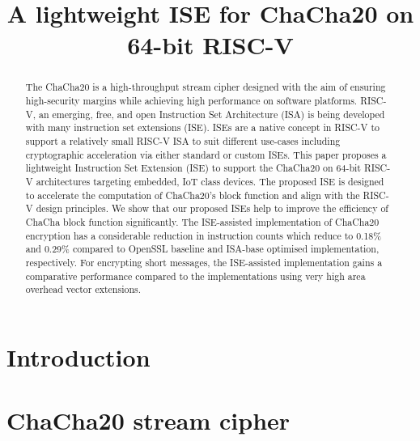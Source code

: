 \documentclass[preprint]{iacrtrans}
\title{A lightweight ISE for ChaCha20 on 64-bit RISC-V}
\author{}
\institute{}
\begin{document}

\maketitle

\begin{abstract}
The ChaCha20 is a high-throughput stream cipher designed with the aim of ensuring high-security margins while achieving high performance on software platforms. RISC-V, an emerging, free, and open Instruction Set Architecture (ISA) is being developed with many instruction set extensions (ISE). ISEs are a native concept in RISC-V to support a relatively small RISC-V ISA to suit different use-cases including cryptographic acceleration via either standard or custom ISEs. This paper proposes a lightweight Instruction Set Extension (ISE) to support the ChaCha20 on 64-bit RISC-V architectures targeting embedded, IoT class devices. The proposed ISE is designed to accelerate the computation of ChaCha20's block function and align with the  RISC-V design principles. We show that our proposed ISEs help to improve the efficiency of ChaCha block function significantly. The ISE-assisted implementation of ChaCha20 encryption has a considerable reduction in instruction counts which reduce to 0.18\% and 0.29\% compared to OpenSSL baseline and ISA-base optimised implementation, respectively. For encrypting short messages, the ISE-assisted implementation gains a comparative performance compared to the implementations using very high area overhead vector extensions.
\end{abstract}



\section{Introduction}
\label{sec:intro}


\section{ChaCha20 stream cipher}
\label{sec:bg}

\end{document}
